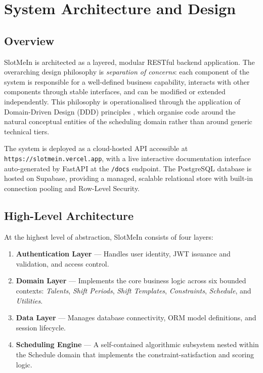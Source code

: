 
\chapter{System Architecture and Design}

\section{Overview}

SlotMeIn is architected as a layered, modular RESTful backend application. The overarching design philosophy is \textit{separation of concerns}: each component of the system is responsible for a well-defined business capability, interacts with other components through stable interfaces, and can be modified or extended independently. This philosophy is operationalised through the application of Domain-Driven Design (DDD) principles \cite{evans_2003}, which organise code around the natural conceptual entities of the scheduling domain rather than around generic technical tiers.

The system is deployed as a cloud-hosted API accessible at \texttt{https://slotmein.vercel.app}, with a live interactive documentation interface auto-generated by FastAPI at the \texttt{/docs} endpoint. The PostgreSQL database is hosted on Supabase, providing a managed, scalable relational store with built-in connection pooling and Row-Level Security.

\section{High-Level Architecture}

At the highest level of abstraction, SlotMeIn consists of four layers:

\begin{enumerate}
    \item \textbf{Authentication Layer} — Handles user identity, JWT issuance and validation, and access control.
    \item \textbf{Domain Layer} — Implements the core business logic across six bounded contexts: \textit{Talents}, \textit{Shift Periods}, \textit{Shift Templates}, \textit{Constraints}, \textit{Schedule}, and \textit{Utilities}.
    \item \textbf{Data Layer} — Manages database connectivity, ORM model definitions, and session lifecycle.
    \item \textbf{Scheduling Engine} — A self-contained algorithmic subsystem nested within the Schedule domain that implements the constraint-satisfaction and scoring logic.
\end{enumerate}

